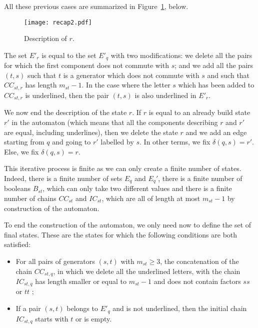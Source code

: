 \documentclass[reqno,12pt]{amsart}
\theoremstyle{definition}
\begin{document}
\begin{itemize}
All these previous cases are summarized in Figure~\ref{figrecap2}, below. 
\begin{figure}[!h]
\texttt{[image: recap2.pdf]}
\caption{\label{figrecap2}Description of $r$. }
\end{figure} 
 
The set $E'_r$ is equal to the set $E'_q$ with two modifications: we delete all the pairs for which the first component does not commute with $s$;  and we add all the pairs $(t,s)$ such that $t$ is a generator which does not commute with $s$ and such that  $CC_{st,r}$ has length $m_{st}-1$. In the case where the letter $s$ which has been added to $CC_{st,r}$ is underlined, then the pair   $(t,s)$ is also underlined in $E'_r$.


We now end the description of the state $r$. If $r$ is equal to an already build state $r'$  in the automaton (which means that all the components describing $r$ and $r'$ are equal, including underlines), then we delete the state $r$ and we add an edge starting from $q$ and going to $r'$ labelled by $s$. In other terms, we fix $\delta(q,s)=r'$. Else, we fix $\delta(q,s)=r$.

\end{itemize}

This iterative process is finite as we can only create a finite number of states. Indeed, there is a finite number of sets  $E_q$ and $E_q'$, there is a finite number of booleans  $B_{st}$, which can only take two different values and there is a finite number of chains $CC_{st}$ and $IC_{st}$, which are all of length at most  $m_{st}-1$ by construction of the automaton.

To end the construction of the automaton, we only need now to define the set of final states. These are the states for which the following conditions are both satisfied:
\begin{itemize}

 \item For all pairs of generators  $(s,t)$ with $m_{st}\geq 3$, the concatenation of the chain $CC_{st,q}$, in which we delete all the underlined letters, with the chain  $IC_{st,q}$ has length smaller or equal to $m_{st}-1$ and does not contain factors $ss$ or $tt$ ;
 \item If a pair $(s,t)$ belongs to $E'_q$ and is not underlined, then the initial chain $IC_{st,q}$ starts with $ t $ or is empty.
 \end{itemize}
 
\medskip
\end{document}
